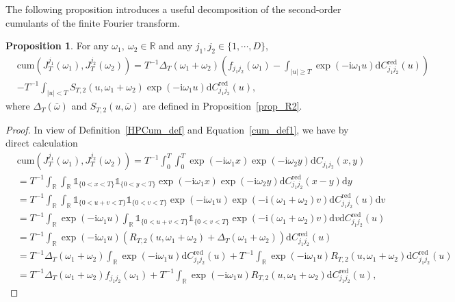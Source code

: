 \documentclass[11pt]{article}
\numberwithin{equation}{section}
\theoremstyle{plain}
\theoremstyle{definition}
\theoremstyle{definition}
\theoremstyle{assumption}
\theoremstyle{proposition}
\newtheorem{proposition}{Proposition}[section]
\theoremstyle{proposition}
\theoremstyle{example}
\theoremstyle{lemma}
\theoremstyle{theorem}
\theoremstyle{remark}
\begin{document}
The following proposition introduces a useful decomposition of the second-order cumulants of the finite Fourier transform.
\begin{proposition}\label{cov_J_prop}
For any $\omega_1,~\omega_2\in\mathbb{R}$ and any $j_1,j_2\in\{1,\cdots,D\}$,
\begin{align*}
&\mathrm{cum}(J_T^{j_1}(\omega_{1}), J_T^{j_2}(\omega_{2})) 
=T^{-1}\Delta_T(\omega_1+\omega_2)\left(f_{j_1j_2}(\omega_1) - \int_{|u|\geqslant T} \exp(-\mathrm{i}\omega_1 u)\mathrm{d}C_{j_1j_2}^{\mathrm{red}}(u) \right) \\
&-T^{-1} \int_{|u|< T} S_{T,2}(u,\omega_1+\omega_2) \exp(-\mathrm{i}\omega_1 u)\mathrm{d}C_{j_1j_2}^{\mathrm{red}}(u) ,
\end{align*}
where $\Delta_T(\bar{\omega})$ and $S_{T,2}(u,\bar{\omega})$ are defined in Proposition~\ref{prop_R2}.
\begin{proof}
In view of Definition~\ref{HPCum_def} and Equation~\eqref{cum_def1}, we have by direct calculation
\begin{align*}
&\mathrm{cum}(J_T^{j_1}(\omega_{1}), J_T^{j_2}(\omega_{2})) 
= T^{-1}\int_{0}^T\int_{0}^T \exp(-\mathrm{i}\omega_1 x)\exp(-\mathrm{i}\omega_2 y) \mathrm{d}C_{j_1j_2}(x,y) \\
&= T^{-1}\int_{\mathbb{R}}\int_{\mathbb{R}}\mathds{1}_{\{0<x< T\}}\mathds{1}_{\{0<y< T\}} \exp(-\mathrm{i}\omega_1 x)\exp(-\mathrm{i}\omega_2 y) \mathrm{d}C_{j_1j_2}^{\mathrm{red}}(x-y)\mathrm{d}y \\
&= T^{-1}\int_{\mathbb{R}}\int_{\mathbb{R}}\mathds{1}_{\{0<u+v< T\}}\mathds{1}_{\{0<v< T\}} \exp(-\mathrm{i}\omega_1 u)\exp(-\mathrm{i}(\omega_1+\omega_2) v) \mathrm{d}C_{j_1j_2}^{\mathrm{red}}(u)\mathrm{d}v \\
&=T^{-1}\int_{\mathbb{R}}\exp(-\mathrm{i}\omega_1 u)\int_{\mathbb{R}}\mathds{1}_{\{0<u+v< T\}}\mathds{1}_{\{0<v< T\}} \exp(-\mathrm{i}(\omega_1+\omega_2) v) \mathrm{d}v\mathrm{d}C_{j_1j_2}^{\mathrm{red}}(u) \\
&=T^{-1}\int_{\mathbb{R}}\exp(-\mathrm{i}\omega_1 u)\left(R_{T,2}(u,\omega_1+\omega_2) + \Delta_T(\omega_1+\omega_2)\right)\mathrm{d}C_{j_1j_2}^{\mathrm{red}}(u) \\
&=T^{-1}\Delta_T(\omega_1+\omega_2)\int_{\mathbb{R}}\exp(-\mathrm{i}\omega_1 u)\mathrm{d}C_{j_1j_2}^{\mathrm{red}}(u) +T^{-1}\int_{\mathbb{R}}\exp(-\mathrm{i}\omega_1 u)R_{T,2}(u,\omega_1+\omega_2)\mathrm{d}C_{j_1j_2}^{\mathrm{red}}(u)\\
&=T^{-1} \Delta_T(\omega_1+\omega_2) f_{j_1j_2}(\omega_1) +T^{-1}\int_{\mathbb{R}}\exp(-\mathrm{i}\omega_1 u)R_{T,2}(u,\omega_1+\omega_2)\mathrm{d}C_{j_1j_2}^{\mathrm{red}}(u),

\end{align*}
\end{proof}
\end{proposition}
\end{document}
